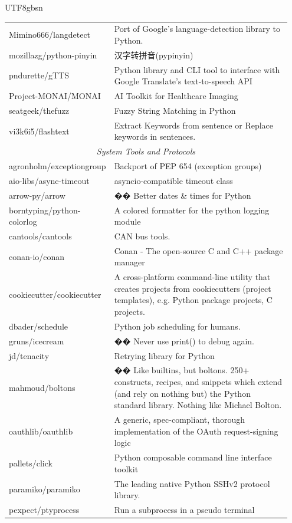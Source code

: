 \begin{CJK*}{UTF8}{gbsn}
\begin{longtable}{p{0.3\linewidth} | p{0.65\linewidth}}
Mimino666/langdetect & Port of Google's language-detection library to Python. \\
mozillazg/python-pinyin & 汉字转拼音(pypinyin) \\
pndurette/gTTS & Python library and CLI tool to interface with Google Translate's text-to-speech API \\
Project-MONAI/MONAI & AI Toolkit for Healthcare Imaging \\
seatgeek/thefuzz & Fuzzy String Matching in Python \\
vi3k6i5/flashtext & Extract Keywords from sentence or Replace keywords in sentences. \\
\midrule
\multicolumn{2}{c}{\textit{System Tools and Protocols}} \\
\midrule
agronholm/exceptiongroup & Backport of PEP 654 (exception groups) \\
aio-libs/async-timeout & asyncio-compatible timeout class \\
arrow-py/arrow & �� Better dates \& times for Python \\
borntyping/python-colorlog & A colored formatter for the python logging module \\
cantools/cantools & CAN bus tools. \\
conan-io/conan & Conan - The open-source C and C++ package manager \\
cookiecutter/cookiecutter & A cross-platform command-line utility that creates projects from cookiecutters (project templates), e.g. Python package projects, C projects. \\
dbader/schedule & Python job scheduling for humans. \\
gruns/icecream & �� Never use print() to debug again. \\
jd/tenacity & Retrying library for Python \\
mahmoud/boltons & �� Like builtins, but boltons. 250+ constructs, recipes, and snippets which extend (and rely on nothing but) the Python standard library.  Nothing like Michael Bolton. \\
oauthlib/oauthlib & A generic, spec-compliant, thorough implementation of the OAuth request-signing logic \\
pallets/click & Python composable command line interface toolkit \\
paramiko/paramiko & The leading native Python SSHv2 protocol library. \\
pexpect/ptyprocess & Run a subprocess in a pseudo terminal \\

\end{longtable}
\end{CJK*}
